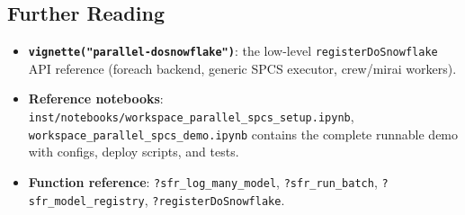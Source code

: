 \documentclass[
]{article}
\providecommand{\tightlist}{%
  \setlength{\itemsep}{0pt}\setlength{\parskip}{0pt}}
\begin{document}
\subsection{Further Reading}\label{further-reading}

\begin{itemize}
\tightlist
\item
  \textbf{\texttt{vignette("parallel-dosnowflake")}}: the low-level
  \texttt{registerDoSnowflake} API reference (foreach backend, generic
  SPCS executor, crew/mirai workers).
\item
  \textbf{Reference notebooks}:
  \texttt{inst/notebooks/workspace\_parallel\_spcs\_setup.ipynb},
  \texttt{workspace\_parallel\_spcs\_demo.ipynb} contains the complete
  runnable demo with configs, deploy scripts, and tests.
\item
  \textbf{Function reference}: \texttt{?sfr\_log\_many\_model},
  \texttt{?sfr\_run\_batch}, \texttt{?sfr\_model\_registry},
  \texttt{?registerDoSnowflake}.
\end{itemize}
\end{document}
